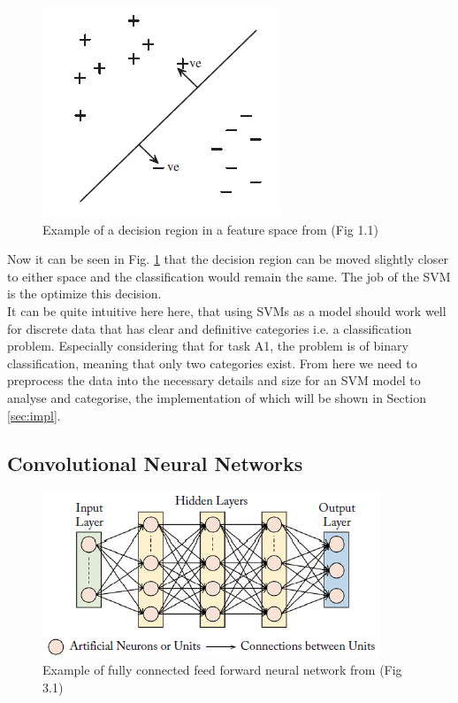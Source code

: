 \documentclass{article}
\begin{document}
    \begin{figure}[htb]
    	\centering
    	\includegraphics[scale=0.7]{Figures/Example_SVM.PNG}
    	\caption{Example of a decision region in a feature space from \cite{6812816} (Fig 1.1)}
    	\label{fig:example_svm}
    \end{figure}

    Now it can be seen in Fig. \ref{fig:example_svm} that the decision region can be moved slightly closer to either space and the classification would remain the same. The job of the SVM is the optimize this decision. \\
    It can be quite intuitive here here, that using SVMs as a model should work well for discrete data that has clear and definitive categories i.e. a classification problem. Especially considering that for task A1, the problem is of binary classification, meaning that only two categories exist. From here we need to preprocess the data into the necessary details and size for an SVM model to analyse and categorise, the implementation of which will be shown in Section \ref{sec:impl}.
    
    \subsection{Convolutional Neural Networks}
    \begin{figure}[htb]
    	\centering
    	\includegraphics[scale=0.7]{Figures/Example_NN.PNG}
    	\caption{Example of fully connected feed forward neural network from \cite{8295029} (Fig 3.1)}
    	\label{fig:example_nn}
    \end{figure}
    
\end{document}

